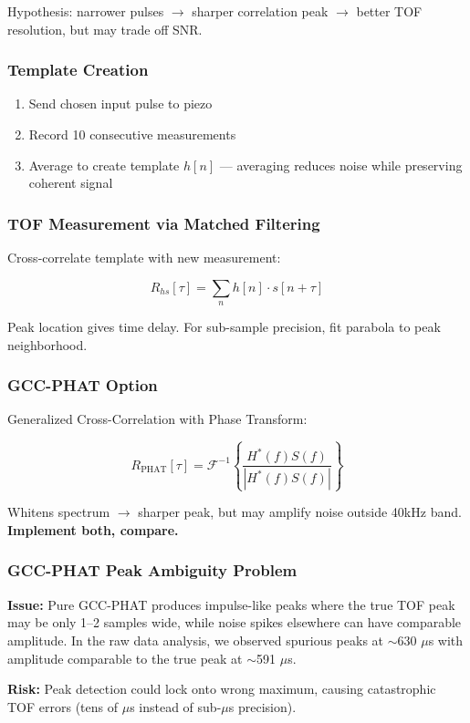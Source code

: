 \documentclass[11pt]{article}
\begin{document}
Hypothesis: narrower pulses $\rightarrow$ sharper correlation peak $\rightarrow$ better TOF resolution, but may trade off SNR.

\subsubsection{Template Creation}
\begin{enumerate}
    \item Send chosen input pulse to piezo
    \item Record 10 consecutive measurements
    \item Average to create template $h[n]$ --- averaging reduces noise while preserving coherent signal
\end{enumerate}

\subsubsection{TOF Measurement via Matched Filtering}
Cross-correlate template with new measurement:

$$R_{hs}[\tau] = \sum_n h[n] \cdot s[n + \tau]$$

Peak location gives time delay. For sub-sample precision, fit parabola to peak neighborhood.

\subsubsection{GCC-PHAT Option}
Generalized Cross-Correlation with Phase Transform:

$$R_{\text{PHAT}}[\tau] = \mathcal{F}^{-1}\left\{ \frac{H^*(f) S(f)}{|H^*(f) S(f)|} \right\}$$

Whitens spectrum $\rightarrow$ sharper peak, but may amplify noise outside 40kHz band. \textbf{Implement both, compare.}

\subsubsection{GCC-PHAT Peak Ambiguity Problem}

\textbf{Issue:} Pure GCC-PHAT produces impulse-like peaks where the true TOF peak may be only 1--2 samples wide, while noise spikes elsewhere can have comparable amplitude. In the raw data analysis, we observed spurious peaks at $\sim$630 $\mu$s with amplitude comparable to the true peak at $\sim$591 $\mu$s.

\textbf{Risk:} Peak detection could lock onto wrong maximum, causing catastrophic TOF errors (tens of $\mu$s instead of sub-$\mu$s precision).
\end{document}
